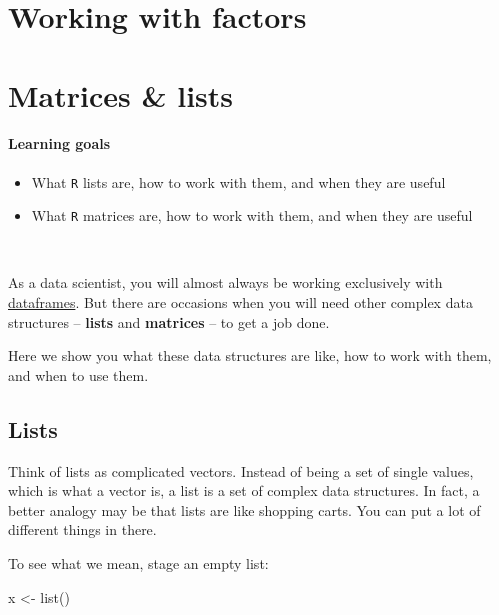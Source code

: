 \documentclass[
]{book}
\newenvironment{Shaded}{\begin{snugshade}}{\end{snugshade}}
\newcommand{\FunctionTok}[1]{\textcolor[rgb]{0.00,0.00,0.00}{#1}}
\newcommand{\NormalTok}[1]{#1}
\newcommand{\OtherTok}[1]{\textcolor[rgb]{0.56,0.35,0.01}{#1}}
\providecommand{\tightlist}{%
  \setlength{\itemsep}{0pt}\setlength{\parskip}{0pt}}
\begin{document}
\hypertarget{working-with-factors}{%
\chapter{Working with factors}\label{working-with-factors}}

\hypertarget{matrices-lists}{%
\chapter{Matrices \& lists}\label{matrices-lists}}

\hypertarget{learning-goals-20}{%
\subsubsection*{Learning goals}\label{learning-goals-20}}

\begin{itemize}
\tightlist
\item
  What \texttt{R} lists are, how to work with them, and when they are useful\\
\item
  What \texttt{R} matrices are, how to work with them, and when they are useful
\end{itemize}

~

As a data scientist, you will almost always be working exclusively with \protect\hyperlink{dataframes}{dataframes}. But there are occasions when you will need other complex data structures -- \textbf{lists} and \textbf{matrices} -- to get a job done.

Here we show you what these data structures are like, how to work with them, and when to use them.

\hypertarget{lists}{%
\section*{Lists}\label{lists}}

Think of lists as complicated vectors. Instead of being a set of single values, which is what a vector is, a list is a set of complex data structures. In fact, a better analogy may be that lists are like shopping carts. You can put a lot of different things in there.

To see what we mean, stage an empty list:

\begin{Shaded}
\begin{Highlighting}[]
\NormalTok{x }\OtherTok{\textless{}{-}} \FunctionTok{list}\NormalTok{()}
\end{Highlighting}
\end{Shaded}
\end{document}
